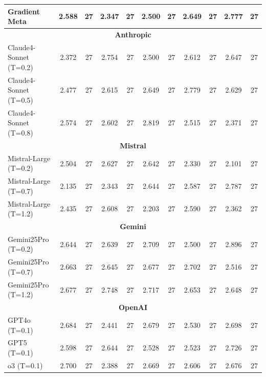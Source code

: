 \begin{table}
\begin{tabular}{|l|cc|cc|cc|cc|cc|}
Gradient Meta & 2.588 & 27 & 2.347 & 27 & 2.500 & 27 & 2.649 & 27 & 2.777 & 27 \\
\hline
\multicolumn{11}{|c|}{\textbf{Anthropic}} \\
\hline
Claude4-Sonnet (T=0.2) & 2.372 & 27 & 2.754 & 27 & 2.500 & 27 & 2.612 & 27 & 2.647 & 27 \\
Claude4-Sonnet (T=0.5) & 2.477 & 27 & 2.615 & 27 & 2.649 & 27 & 2.779 & 27 & 2.629 & 27 \\
Claude4-Sonnet (T=0.8) & 2.574 & 27 & 2.602 & 27 & 2.819 & 27 & 2.515 & 27 & 2.371 & 27 \\
\hline
\multicolumn{11}{|c|}{\textbf{Mistral}} \\
\hline
Mistral-Large (T=0.2) & 2.504 & 27 & 2.627 & 27 & 2.642 & 27 & 2.330 & 27 & 2.101 & 27 \\
Mistral-Large (T=0.7) & 2.135 & 27 & 2.343 & 27 & 2.644 & 27 & 2.587 & 27 & 2.787 & 27 \\
Mistral-Large (T=1.2) & 2.435 & 27 & 2.608 & 27 & 2.203 & 27 & 2.590 & 27 & 2.362 & 27 \\
\hline
\multicolumn{11}{|c|}{\textbf{Gemini}} \\
\hline
Gemini25Pro (T=0.2) & 2.644 & 27 & 2.639 & 27 & 2.709 & 27 & 2.500 & 27 & 2.896 & 27 \\
Gemini25Pro (T=0.7) & 2.663 & 27 & 2.645 & 27 & 2.677 & 27 & 2.702 & 27 & 2.516 & 27 \\
Gemini25Pro (T=1.2) & 2.677 & 27 & 2.748 & 27 & 2.717 & 27 & 2.653 & 27 & 2.648 & 27 \\
\hline
\multicolumn{11}{|c|}{\textbf{OpenAI}} \\
\hline
GPT4o (T=0.1) & 2.684 & 27 & 2.441 & 27 & 2.679 & 27 & 2.530 & 27 & 2.698 & 27 \\
GPT5 (T=0.1) & 2.598 & 27 & 2.644 & 27 & 2.528 & 27 & 2.523 & 27 & 2.726 & 27 \\
o3 (T=0.1) & 2.700 & 27 & 2.388 & 27 & 2.669 & 27 & 2.606 & 27 & 2.676 & 27 \\
\hline
\end{tabular}
\end{table}

\clearpage


